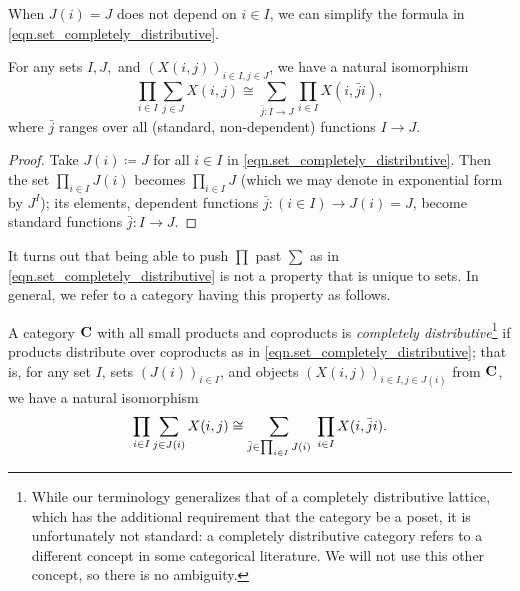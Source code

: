 \documentclass[Book-Poly]{subfiles}
\begin{document}
When $J(i)=J$ does not depend on $i\in I$, we can simplify the formula in \eqref{eqn.set_completely_distributive}.

\begin{corollary} \label{cor.push_prod_sum_set_indep}
    For any sets $I, J,$ and $(X(i, j))_{i \in I, j \in J}$, we have a natural isomorphism
    \begin{equation} \label{eqn.push_prod_sum_set_indep}
        \prod_{i\in I}\sum_{j\in J}X(i,j)\cong\sum_{\bar{j}\colon I\to J}\prod_{i\in I}X(i,\bar{j}i),
    \end{equation}
    where $\bar{j}$ ranges over all (standard, non-dependent) functions $I\to J$.
\end{corollary}
\begin{proof}
    Take $J(i)\coloneqq J$ for all $i \in I$ in \eqref{eqn.set_completely_distributive}.
    Then the set $\prod_{i\in I}J(i)$ becomes $\prod_{i\in I}J$ (which we may denote in exponential form by $J^I$); its elements, dependent functions $\bar{j}\colon(i\in I)\to J(i)=J$, become standard functions $\bar{j}\colon I\to J$.
\end{proof}

It turns out that being able to push $\prod$ past $\sum$ as in \eqref{eqn.set_completely_distributive} is not a property that is unique to sets.
In general, we refer to a category having this property as follows.

\begin{definition}
    A category $\mathbf{C}$ with all small products and coproducts is \emph{completely distributive}\footnote{While our terminology generalizes that of a completely distributive lattice, which has the additional requirement that the category be a poset, it is unfortunately not standard: a completely distributive category refers to a different concept in some categorical literature. We will not use this other concept, so there is no ambiguity.} if products distribute over coproducts as in \eqref{eqn.set_completely_distributive}; that is, for any set $I$, sets $(J(i))_{i\in I}$, and objects $(X(i,j))_{i\in I,j\in J(i)}$ from $\mathbf{C}$, we have a natural isomorphism
    \begin{equation}\label{eqn.cat_completely_distributive}
        \prod_{i\in I}\sum_{j\in J(i)}X(i,j)
        \cong
        \sum_{\bar{j}\in \prod_{i\in I}J(i)}\;\prod_{i\in I}X(i,\bar{j}i).
    \end{equation}
\end{definition}
\end{document}
